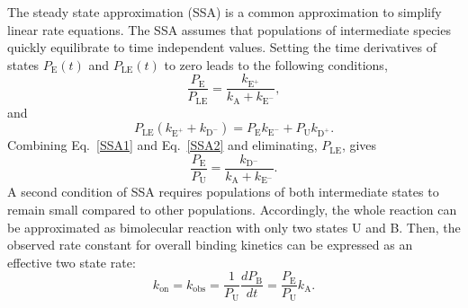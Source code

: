 \documentclass[../talant.diss.submit.tex]{subfiles}
\begin{document}
The steady state approximation (SSA) is a common approximation to simplify
linear rate equations.
The SSA assumes that populations of intermediate species
quickly equilibrate to time independent values.
Setting the time derivatives of states $P_\mathrm{E}(t)$ and $P_\mathrm{LE}(t)$ to zero leads to
the following conditions,
\begin{equation}
  \label{SSA1}
  \frac{P_{\mathrm{E}}}{P_{\mathrm{LE}}} = \frac{k_{\mathrm{E}^{+}}}{ k_{\mathrm{A}} + k_{\mathrm{E}^{-}}},
\end{equation}
and
\begin{equation}
  \label{SSA2}
  P_{\mathrm{LE}} (k_{\mathrm{E}^{+}} + k_{\mathrm{D}^{-}}) = P_{\mathrm{E}} k_{\mathrm{E}^{-}} +
  P_{\mathrm{U}} k_{\mathrm{D}^{+}}.
\end{equation}
%
%
Combining Eq.~\ref{SSA1} and Eq.~\ref{SSA2} and eliminating, $P_{\mathrm{LE}}$, gives
\begin{equation}
  \label{SSA2}
  \frac{P_{\mathrm{E}}}{P_{\mathrm{U}}} = \frac{k_{\mathrm{D}^{-}}}{k_{\mathrm{A}} + k_{\mathrm{E}^{-}}}.
\end{equation}                                                                                                 
A second condition of SSA requires populations of both intermediate states to remain small
compared to other populations. Accordingly, the whole reaction can be approximated as bimolecular
reaction with only two states U and B. Then, the observed rate constant for overall binding
kinetics can be expressed as an effective two state rate:
\begin{equation}
  \label{SSA3}
  k_{\mathrm{on}} =  k_{\mathrm{obs}} = \frac{1}{P_{\mathrm{U}}}\frac{dP_{\mathrm{B}}}{dt} =
  \frac{P_{\mathrm{E}}}{P_{\mathrm{U}}}k_{\mathrm{A}}.
\end{equation}                                                                                           
\end{document}
